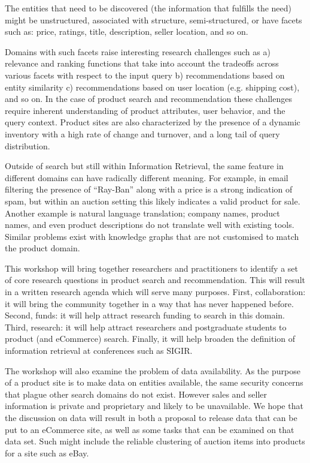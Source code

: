 \documentclass{acmart}
\begin{document}
The entities that need to be discovered (the information that fulfills
the need) might be unstructured, associated
with structure, semi-structured, or have facets such as: price,
ratings, title, description, seller location, and so on. 

Domains with such facets raise interesting research challenges such as
a) relevance and ranking functions that take into account the tradeoffs
across various facets with respect to the input query b) recommendations
based on entity similarity c) recommendations based on user location
(e.g. shipping cost), and so on. In the case of product search and
recommendation these challenges require inherent
understanding of product attributes, user behavior, and the query
context. Product sites are also characterized by the presence of a dynamic
inventory with a high rate of change and turnover, and a long tail of
query distribution.

Outside of search but still within Information Retrieval, the same
feature in different domains can have radically different meaning.  For
example, in email filtering the presence of ``Ray-Ban''  along with a
price is a strong indication of spam, but within an auction setting
this likely indicates a valid product for sale.  Another example is
natural language translation; company names, product names, and even
product descriptions do not translate well with existing tools.  Similar
problems exist with knowledge graphs that are not customised to match
the product domain.

This workshop will bring together researchers and practitioners to
identify a set of core research questions in product search and
recommendation.  This will result in a written research agenda which
will serve many purposes. First, collaboration: it will bring the
community together in a way that has never happened before.  Second,
funds: it will help attract research funding to search in this domain.
Third, research: it will help attract researchers and postgraduate
students to product (and eCommerce) search.  Finally, it will help broaden the
definition of information retrieval at conferences such as SIGIR. 

The workshop will also examine the problem of data availability.  As the
purpose of a product site is to make data on entities available, the
same security concerns that plague other search domains do not exist.
However sales and seller information is private and proprietary and
likely to be unavailable.  We hope that the discussion on data will result
in both a proposal to release data that can be put to an eCommerce site, as well
as some tasks that can be examined on that data set.  Such might include
the reliable clustering of auction items into products for a site such
as eBay.
\end{document}
